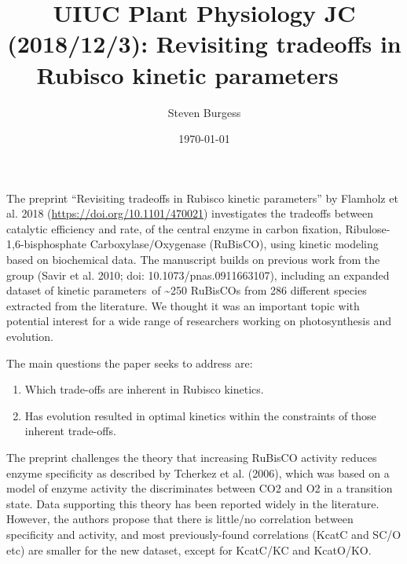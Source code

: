 \documentclass[10pt]{article}
\providecommand{\tightlist}{\setlength{\itemsep}{0pt}\setlength{\parskip}{0pt}}%
\begin{document}
\title{UIUC Plant Physiology JC (2018/12/3): Revisiting tradeoffs in Rubisco
kinetic parameters~ ~}



\author[1]{Steven Burgess}%
%


\vspace{-1em}



  \date{\today}


\begingroup
\let\center\flushleft
\let\endcenter\endflushleft
\maketitle
\endgroup









The preprint ``Revisiting tradeoffs in Rubisco kinetic parameters'' by
Flamholz et al. 2018 (\url{https://doi.org/10.1101/470021}) investigates
the tradeoffs between catalytic efficiency and rate, of the central
enzyme in carbon fixation, Ribulose-1,6-bisphosphate
Carboxylase/Oxygenase (RuBisCO), using kinetic modeling based on
biochemical data. The manuscript builds on previous work from the group
(Savir et al. 2010; doi: 10.1073/pnas.0911663107), including an expanded
dataset of kinetic parameters~of \textasciitilde{}250 RuBisCOs from 286
different species extracted from the literature. We thought it was an
important topic with potential interest for a wide range of researchers
working on photosynthesis and evolution.

\par\null

The main questions the paper seeks to address are:

\par\null

\begin{enumerate}
\tightlist
\item
  Which trade-offs are inherent in Rubisco kinetics.
\item
  Has evolution resulted in optimal kinetics within the constraints of
  those inherent trade-offs.
\end{enumerate}

The preprint challenges the theory that increasing RuBisCO activity
reduces enzyme specificity as described by Tcherkez et al. (2006), which
was based on a model of enzyme activity the discriminates between CO2
and O2 in a transition state. Data supporting this theory has been
reported widely in the literature. However, the authors propose that
there is little/no correlation between specificity and activity, and
most previously-found correlations (KcatC and SC/O etc) are smaller for
the new dataset, except for KcatC/KC and KcatO/KO.
\end{document}
